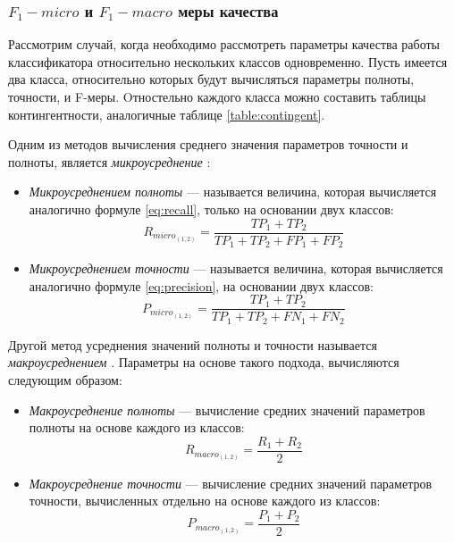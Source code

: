     \subsubsection{$F_1-micro$ и $F_1-macro$ меры качества}
    Рассмотрим случай, когда необходимо рассмотреть параметры качества работы
    классификатора относительно нескольких классов одновременно.
    Пусть имеется два класса, относительно которых будут вычисляться параметры полноты, точности,
    и F-меры.
    Oтностельно каждого класса можно составить таблицы контингентности,
    аналогичные таблице \ref{table:contingent}.

    Одним из методов вычисления среднего значения параметров точности и полноты,
    является {\it микроусреднение} \cite{microMacroMeasures}:
    \begin{itemize}
        \item {\it Микроусреднением полноты} --- называется величина, которая
            вычисляется аналогично формуле \ref{eq:recall}, только на основании
            двух классов:
            \begin{equation}
                R_{micro_{(1, 2)}} = \dfrac{TP_{1} + TP_{2}}{TP_{1} + TP_{2} + FP_{1} + FP_{2}} \nonumber
            \end{equation}
        \item {\it Микроусреднением точности} --- называется величина,
            которая вычисляется аналогично формуле \ref{eq:precision},
            на основании двух классов:
            \begin{equation}
                P_{micro_{(1, 2)}} = \dfrac{TP_{1} + TP_{2}}{TP_{1} + TP_{2} + FN_{1} + FN_{2}} \nonumber
            \end{equation}
    \end{itemize}


    Другой метод усреднения значений полноты и точности называется {\it макроусреднением} \cite{microMacroMeasures}.
    Параметры на основе такого подхода, вычисляются следующим образом:
    \begin{itemize}
        \item {\it Макроусреднение полноты} --- вычисление средних значений параметров
            полноты на основе каждого из классов:
            \begin{equation}
                R_{macro_{(1, 2)}} = \dfrac{R_{1} + R_{2}}{2} \nonumber
            \end{equation}
        \item {\it Макроусреднение точности} --- вычисление средних значений параметров
            точности, вычисленных отдельно на основе каждого из классов:
            \begin{equation}
                P_{macro_{(1, 2)}} = \dfrac{P_{1} + P_{2}}{2} \nonumber
            \end{equation}
    \end{itemize}

